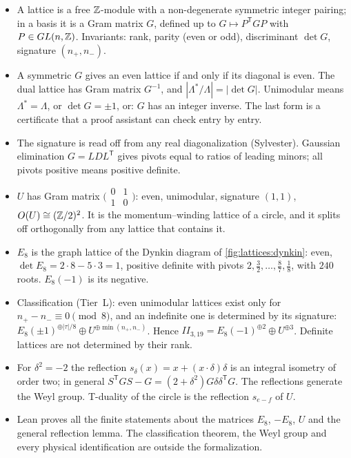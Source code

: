 \begin{summarybox}
\begin{itemize}[leftmargin=*,itemsep=1pt]
\item A lattice is a free $\mathbb{Z}$-module with a non-degenerate symmetric integer pairing; in a
 basis it is a Gram matrix $G$, defined up to $G\mapsto P^{\mathsf T}GP$ with
 $P\in GL(n,\mathbb{Z})$. Invariants: rank, parity (even or odd), discriminant $\det G$, signature
 $(n_+,n_-)$.
\item A symmetric $G$ gives an even lattice if and only if its diagonal is even. The dual
 lattice has Gram matrix $G^{-1}$, and $|\Lambda^*/\Lambda|=|\det G|$. Unimodular means
 $\Lambda^*=\Lambda$, or $\det G=\pm1$, or: $G$ has an integer inverse. The last form is a
 certificate that a proof assistant can check entry by entry.
\item The signature is read off from any real diagonalization (Sylvester). Gaussian
 elimination $G=LDL^{\mathsf T}$ gives pivots equal to ratios of leading minors; all pivots
 positive means positive definite.
\item $U$ has Gram matrix $\bigl(\begin{smallmatrix}0&1\\1&0\end{smallmatrix}\bigr)$: even,
 unimodular, signature $(1,1)$, $O(U)\cong(\mathbb{Z}/2)^2$. It is the momentum--winding lattice of a
 circle, and it splits off orthogonally from any lattice that contains it.
\item $E_8$ is the graph lattice of the Dynkin diagram of \cref{fig:lattices:dynkin}: even,
 $\det E_8=2\cdot8-5\cdot3=1$, positive definite with pivots $2,\frac32,\dots,\frac87,\frac18$,
 with $240$ roots. $E_8(-1)$ is its negative.
\item Classification (Tier~L): even unimodular lattices exist only for
 $n_+-n_-\equiv0\pmod8$, and an indefinite one is determined by its signature:
 $E_8(\pm1)^{\oplus|\tau|/8}\oplus U^{\oplus\min(n_+,n_-)}$. Hence
 $II_{3,19}=E_8(-1)^{\oplus2}\oplus U^{\oplus3}$. Definite lattices are not determined by
 their rank.
\item For $\delta^2=-2$ the reflection $s_\delta(x)=x+(x\cdot\delta)\delta$ is an integral
 isometry of order two; in general $S^{\mathsf T}GS-G=(2+\delta^2)G\delta\delta^{\mathsf T}G$.
 The reflections generate the Weyl group. T-duality of the circle is the reflection
 $s_{e-f}$ of $U$.
\item Lean proves all the finite statements about the matrices $E_8$, $-E_8$, $U$ and the
 general reflection lemma. The classification theorem, the Weyl group and every physical
 identification are outside the formalization.
\end{itemize}
\end{summarybox}

